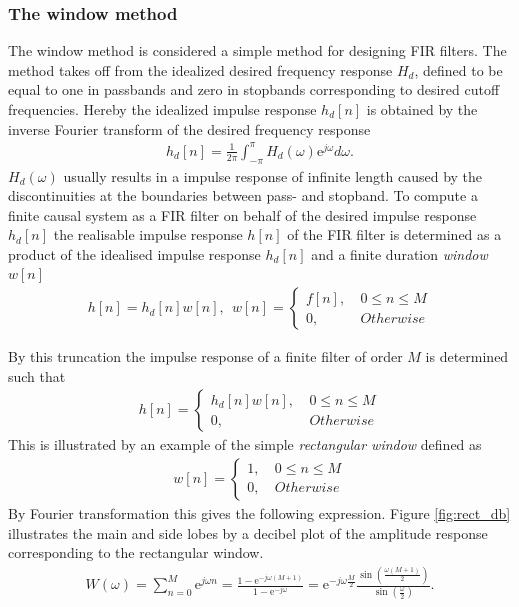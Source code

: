 \subsubsection{The window method}
The window method is considered a simple method for designing FIR filters. The method takes off from the idealized desired frequency response $H_d$, defined to be equal to one in passbands and zero in stopbands corresponding to desired cutoff frequencies. Hereby the idealized impulse response $h_d[n]$ is obtained by the inverse Fourier transform of the desired frequency response
\begin{align}
h_d[n]=\frac{1}{2\pi}\int_{-\pi}^{\pi} H_d(\omega)\text{e}^{j\omega} d\omega.
\end{align}
$H_d(\omega)$ usually results in a impulse response of infinite length caused by the discontinuities at the boundaries between pass- and stopband. To compute a finite causal system as a FIR filter on behalf of the desired impulse response $h_d[n]$ the realisable impulse response $h[n]$ of the FIR filter is determined as a product of the idealised impulse response $h_d[n]$ and a finite duration \textit{window} $w[n]$ 
\begin{align}
h[n]=h_d[n]w[n], \ \ w[n] =
\left\{ \begin{matrix}
f[n], &\ 0 \leq n \leq M \\
0, &\ Otherwise
\end{matrix}\right.
\end{align}

By this truncation the impulse response of a finite filter of order $M$ is determined such that
\begin{align}
h[n]= 
\left\{ \begin{matrix}
h_d[n]w[n], &\ 0 \leq n \leq M \\
0, &\ Otherwise
\end{matrix}\right.
\end{align}
This is illustrated by an example of the simple \textit{rectangular window} defined as 
\begin{align}
w[n] =
\left\{ \begin{matrix}
1, &\ 0 \leq n \leq M \\
0, &\ Otherwise
\end{matrix}\right.
\end{align}
By Fourier transformation this gives the following expression. Figure \ref{fig:rect_db} illustrates the main and side lobes by a decibel plot of the amplitude response corresponding to the rectangular window.
\begin{align}
W \left(\omega\right)=\sum_{n=0}^{M} \text{e}^{j\omega n} = \frac{1- \text{e}^{-j\omega(M+1)}}{1- \text{e}^{-j\omega}} = \text{e}^{-j\omega \frac{M}{2}} \frac{ \sin \left( \frac{\omega \left( M+1 \right)}{2} \right)}{\sin \left( \frac{\omega}{2} \right)}.
\end{align}

